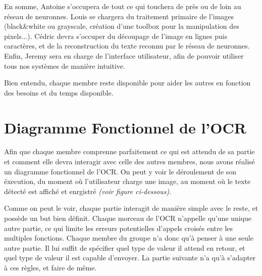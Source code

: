 \documentclass[12pt]{report}
\begin{document}
En somme, Antoine s'occupera de tout ce qui touchera de près ou de loin au réseau de neuronnes. Louis se chargera du traitement primaire de l'images (black\&white ou grayscale, création d'une toolbox pour la manipulation des pixels...). Cédric devra s'occuper du découpage de l'image en lignes puis caractères, et de la reconstruction du texte reconnu par le réseau de neuronnes. Enfin, Jeremy sera en charge de l'interface utilisateur, afin de pouvoir utiliser tous nos systèmes de manière intuitive.

Bien entendu, chaque membre reste disponible pour aider les autres en fonction des besoins et du temps disponible.

\chapter{Diagramme Fonctionnel de l'OCR}

Afin que chaque membre comprenne parfaitement ce qui est attendu de sa partie et comment elle devra interagir avec celle des autres membres, nous avons réalisé un diagramme fonctionnel de l'OCR. On peut y voir le déroulement de son éxecution, du moment où l'utilisateur charge une image, au moment où le texte détecté est affiché et enrgistré \textit{(voir figure ci-dessous)}.

Comme on peut le voir, chaque partie interagit de manière simple avec le reste, et possède un but bien définit. Chaque morceau de l'OCR n'appelle qu'une unique autre partie, ce qui limite les erreurs potentielles d'appels croisés entre les multiples fonctions. Chaque membre du groupe n'a donc qu'à penser à une seule autre partie. Il lui suffit de spécifier quel type de valeur il attend en retour, et quel type de valeur il est capable d'envoyer. La partie suivante n'a qu'à s'adapter à ces règles, et faire de même.
\end{document}
